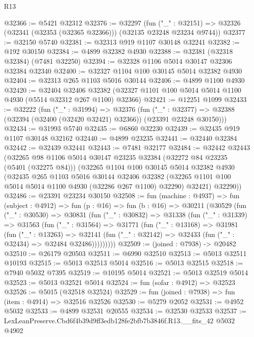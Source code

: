 \begin{lexlean}{R13}
\begin{coremodule}
@32366 := @5421 @32312
@32376 := @32297
    (fun ("_" : @32151) => @32326 (@32341 (@32353 (@32365 @32366))) (@32135 @23248 @23234 @9744))
@32377 := @32150 @5740
@32381 := @32313 @919 @1107 @30148 @32241
@32382 := @192 @30150
@32384 := @4899 @32382 @4930
@32388 := @32381 (@32318 @32384) (@7481 @32250)
@32394 := @32328 @1106 @5014 @30147 @32306 @32384 @32340
@32400 := @32327 @1104 @100 @30145 @5014 @32382 @4930
@32404 := @32313 @265 @1103 @5016 @30144
@32406 := @4899 @1100 @4930
@32420 := @32404
    @32406
    @32382
    (@32327 @1101 @100 @5014 @5014 @1100 @4930 (@5514 @32312 @267 @1100) @32366)
@32421 := @12251 @1099
@32433 := @32222
    (fun ("_" : @31994) =>
    @32376
      (fun ("_" : @32377) =>
      @32388 (@32394 (@32400 (@32420 @32421) @32366)) (@23391 @23248 @30150)))
@32434 := @31993 @5740
@32435 := @6860 @32230
@32439 := @32435 @919 @1107 @30148 @32162
@32440 := @4899 @23235
@32441 := @32440 @32384
@32442 := @32439 @32441
@32443 := @7481 @32177
@32484 := @32442
    @32443
    (@32265
      @98
      @1106
      @5014
      @30147
      @23235
      @32384
      (@32272 @84 @23235 (@5401 (@32275 @84)))
      (@32265
        @1104
        @100
        @30145
        @5014
        @32382
        @4930
        (@32435
          @265
          @1103
          @5016
          @30144
          @32406
          @32382
          (@32265 @1101 @100 @5014 @5014 @1100 @4930 (@32286 @267 @1100) @32290)
          @32421)
        @32290))
@32486 := @23391 @23234 @30150
@32508 := fun (machine : @4937) =>
  fun (subject : @4912) =>
  fun (p : @16) =>
  fun (b : @16) =>
  @30211
    (@30529
      (fun ("_" : @30530) =>
      @30831
        (fun ("_" : @30832) =>
        @31338
          (fun ("_" : @31339) =>
          @31563
            (fun ("_" : @31564) =>
            @31771
              (fun ("_" : @13168) =>
              @31981
                (fun ("_" : @13263) =>
                @32141 (fun ("_" : @32142) => @32433 (fun ("_" : @32434) => @32484 @32486)))))))))
@32509 := (joined : @7938) -> @20482
@32510 := @26179 @20503
@32511 := @6990 @32510
@32513 := @5013 @32511 @10193
@32515 := @5013 @32513 @5014
@32516 := @5013 @32515
@32518 := @7940 @5032 @7395
@32519 := @10195 @5014
@32521 := @5013 @32519 @5014
@32523 := @5013 @32521 @5014
@32524 := fun (sofar : @4912) => @32523
@32526 := @5015 (@32518 @32524)
@32529 := fun (joined : @7938) => fun (item : @4914) => @32516 @32526
@32530 := @5279 @2052
@32531 := @4952 @5032
@32533 := @4899 @32531 @20555
@32534 := @32530 @32533
@32537 := LexLeanPreserve.Cbd6f4b39d9ff3edb128fe2bfb7b3846f.R13.__fits_42 @5032 @4902

\end{coremodule}
\end{lexlean}

